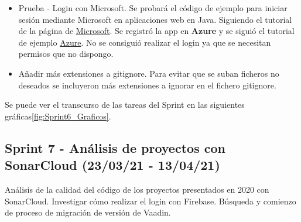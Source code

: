 \begin{itemize}
	\item Prueba - Login con Microsoft.
		Se probará el código de ejemplo para iniciar sesión mediante Microsoft en aplicaciones web en Java. Siguiendo el tutorial de la página de \href{https://docs.microsoft.com/en-us/azure/active-directory/develop/quickstart-v2-java-webapp}{Microsoft}. Se registró la app en \textbf{Azure} y se siguió el tutorial de ejemplo \href{https://portal.azure.com/#blade/Microsoft_AAD_RegisteredApps/ApplicationsListBlade/quickStartType/JavaQuickstartPage/sourceType/docs}{Azure}. No se consiguió realizar el login ya que se necesitan permisos que no dispongo.
	\item Añadir más extensiones a gitignore. 
		Para evitar que se suban ficheros no deseados se incluyeron más extensiones a ignorar en el fichero gitignore. 
	
\end{itemize}

Se puede ver el transcurso de las tareas del Sprint en las siguientes gráficas\ref{fig:Sprint6_Graficos}.



\subsection{Sprint 7 - Análisis de proyectos con SonarCloud (23/03/21 - 13/04/21)}
Análisis de la calidad del código de los proyectos presentados en 2020 con SonarCloud. Investigar cómo realizar el login con Firebase. Búsqueda y comienzo de proceso de migración de versión de Vaadin.

